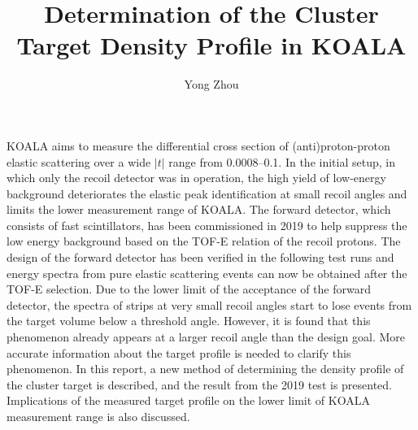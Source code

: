 \documentclass[fleqn,twocolumn,a4paper]{ikpar}
\begin{document}
\parindent=0pt
\frenchspacing

\title{{\bf
    Determination of the Cluster Target Density Profile in KOALA
}}
\author{Yong Zhou
}

\maketitle

KOALA aims to measure the differential cross section of (anti)proton-proton elastic
scattering over a wide $|t|$ range from \SIrange{0.0008}{0.1}{\tmom}.
In the initial setup, in which only the recoil detector was in operation, the high yield of low-energy
background deteriorates the elastic peak identification at small recoil angles and limits the lower measurement range of KOALA.
The forward detector, which consists of fast scintillators, has been
commissioned in 2019 to help suppress the low energy background based on the TOF-E
relation of the recoil protons.
The design of the forward detector has been verified in the following test runs and energy spectra from pure elastic scattering events can now be obtained after the TOF-E selection.
Due to the lower limit of the acceptance of the forward detector, the spectra
of strips at very small recoil angles start to lose events from the
target volume below a threshold angle.
However, it is found that this phenomenon already appears at a larger recoil angle than the design goal.
More accurate information about the target profile is needed to clarify this phenomenon.
In this report, a new method of determining the density profile of the cluster
target is described, and the result from the 2019 test is presented.
Implications of the measured target profile on the lower limit of KOALA measurement range is also discussed.
\end{document}
